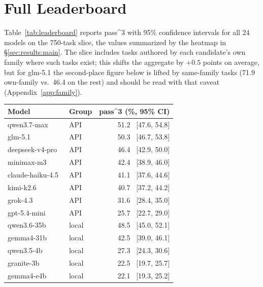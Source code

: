 \appendix

\section{Full Leaderboard}
\label{app:leaderboard}
Table~\ref{tab:leaderboard} reports pass\textasciicircum{}3 with 95\% confidence
intervals for all 24 models on the 750-task slice, the values summarized by
the heatmap in \S\ref{sec:results:main}. The slice includes tasks authored by
each candidate's own family where such tasks exist; this shifts the aggregate
by $+0.5$ points on average, but for glm-5.1 the second-place figure below is
lifted by same-family tasks (71.9 own-family vs.\ 46.4 on the rest) and should
be read with that caveat (Appendix~\ref{app:family}).

\begin{table}[t]
  \centering
  \small
  \begin{tabular}{llr}
    \toprule
    Model & Group & pass\textasciicircum{}3 (\%, 95\% CI) \\
    \midrule
    qwen3.7-max~\cite{qwen37} & API & 51.2 \, [47.6, 54.8] \\
    glm-5.1~\cite{glm5team2026glm5vibecodingagentic} & API & 50.3 \, [46.7, 53.8] \\
    deepseek-v4-pro~\cite{deepseekai2026deepseekv4} & API & 46.4 \, [42.9, 50.0] \\
    minimax-m3~\cite{lai2026minimaxsparseattention} & API & 42.4 \, [38.9, 46.0] \\
    claude-haiku-4.5~\cite{ClaudeHaiku4.5} & API & 41.1 \, [37.6, 44.6] \\
    kimi-k2.6~\cite{kimiteam2026kimik2openagentic} & API & 40.7 \, [37.2, 44.2] \\
    grok-4.3~\cite{grok43_xai} & API & 31.6 \, [28.4, 35.0] \\
    gpt-5.4-mini~\cite{singh2026openaigpt5card} & API & 25.7 \, [22.7, 29.0] \\
    \midrule
    qwen3.6-35b~\cite{qwen36_35b_a3b} & local & 48.5 \, [45.0, 52.1] \\
    gemma4-31b~\cite{gemma4google} & local & 42.5 \, [39.0, 46.1] \\
    qwen3.5-4b~\cite{qwen3.5} & local & 27.3 \, [24.3, 30.6] \\
    granite-3b~\cite{stallone2024scalinggranitecodemodels} & local & 22.5 \, [19.7, 25.7] \\
    gemma4-e4b~\cite{gemma4google} & local & 22.1 \, [19.3, 25.2] \\

\end{tabular}
\end{table}
